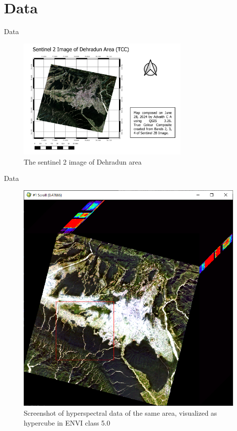 \documentclass{beamer}
\begin{document}
\section{Data}
\begin{frame}{Data}
    \begin{figure}
        \centering
        \includegraphics[width=0.75\textwidth]{../images/map_s2.png}
        \caption{The sentinel 2 image of Dehradun area}
        \label{fig:fig-2}
    \end{figure}
\end{frame}
\begin{frame}{Data}
    \begin{figure}
        \centering
        \includegraphics[width=0.5\linewidth]{../images/hyper.png}
        \caption{Screenshot of hyperspectral data of the same area, visualized as hypercube in ENVI class 5.0}
        \label{fig:fig-3}
    \end{figure}
\end{frame}
\end{document}
